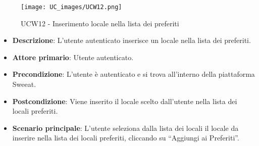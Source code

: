 \begin{figure}[!h]
\centering
    \texttt{[image: UC\_images/UCW12.png]} 
    \caption{UCW12 - Inserimento locale nella lista dei preferiti}
\end{figure}
\begin{itemize}
    \item \textbf{Descrizione}: L'utente autenticato inserisce un locale nella lista dei preferiti.
    \item \textbf{Attore primario}: Utente autenticato.
    \item \textbf{Precondizione}: L'utente è autenticato e si trova all’interno della piattaforma Sweeat.
    \item \textbf{Postcondizione}: Viene inserito il locale scelto dall’utente nella lista dei locali preferiti.
    \item \textbf{Scenario principale}: L’utente seleziona dalla lista dei locali il locale da inserire nella lista dei locali preferiti, cliccando su “Aggiungi ai Preferiti”.
\end{itemize}

\pagebreak